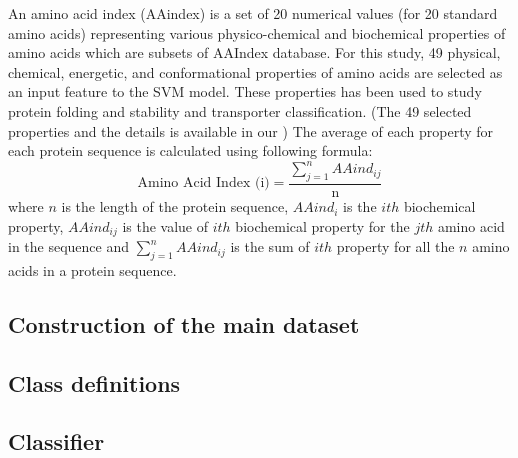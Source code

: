     
    An amino acid index (AAindex) is a set of 20 numerical values (for 20 standard amino acids) representing various physico-chemical 
    and biochemical properties of amino acids which are subsets of AAIndex database. \cite{aaindex} For this study, 49 physical, 
    chemical, energetic, and conformational properties of amino acids are selected as an input feature to the SVM model. These properties 
    has been used to study protein folding and stability and transporter classification.
    \cite{zavaljevski2002support, gromiha1999importance, gromiha2006statistical} (The 49 selected properties and the details is 
    available in our ) The average of each property for each protein sequence is calculated using following formula:
    \begin{equation}
        \text{Amino Acid Index (i)} = \frac {\sum_{j=1}^{n} AAind_{ij}} {\text{n}}
    \end{equation}
    where $n$ is the length of the protein sequence, $AAind_{i}$ is the $ith$ biochemical property, $AAind_{ij}$ is the value of $ith$ 
    biochemical property for the $jth$ amino acid in the sequence and $\sum_{j=1}^{n} AAind_{ij}$ is the sum of $ith$ property for all the
    $n$ amino acids in a protein sequence.


    \subsection{Construction of the main dataset}

    \subsection{Class definitions}

    \subsection{Classifier}
        

